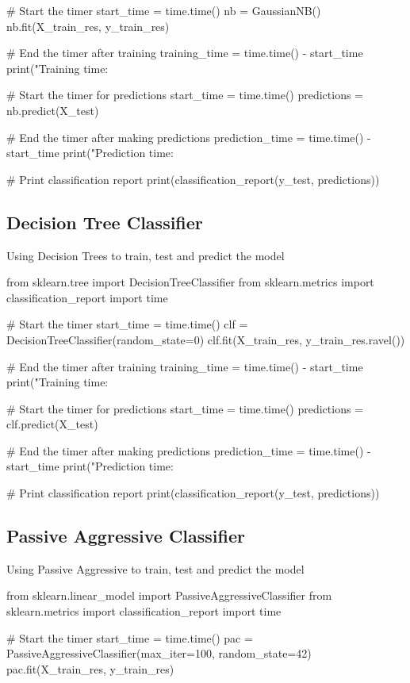 \documentclass{josis}
\begin{document}
{\begin{python}
# Start the timer
start_time = time.time()
nb = GaussianNB()
nb.fit(X_train_res, y_train_res)

# End the timer after training
training_time = time.time() - start_time
print("Training time: %

# Start the timer for predictions
start_time = time.time()
predictions = nb.predict(X_test)

# End the timer after making predictions
prediction_time = time.time() - start_time
print("Prediction time: %

# Print classification report
print(classification_report(y_test, predictions))
\end{python}

\subsection{Decision Tree Classifier}
Using Decision Trees to train, test and predict the model
\begin{python}
from sklearn.tree import DecisionTreeClassifier
from sklearn.metrics import classification_report
import time

# Start the timer
start_time = time.time()
clf = DecisionTreeClassifier(random_state=0)
clf.fit(X_train_res, y_train_res.ravel())

# End the timer after training
training_time = time.time() - start_time
print("Training time: %

# Start the timer for predictions
start_time = time.time()
predictions = clf.predict(X_test)

# End the timer after making predictions
prediction_time = time.time() - start_time
print("Prediction time: %

# Print classification report
print(classification_report(y_test, predictions))
\end{python}

\subsection{Passive Aggressive Classifier}
Using Passive Aggressive to train, test and predict the model
\begin{python}
from sklearn.linear_model import PassiveAggressiveClassifier
from sklearn.metrics import classification_report
import time

# Start the timer
start_time = time.time()
pac = PassiveAggressiveClassifier(max_iter=100, random_state=42)
pac.fit(X_train_res, y_train_res)


\end{python}}
\end{document}

